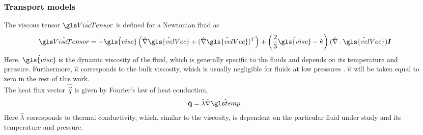 \subsubsection{Transport models}
The viscous tensor $\glsHat{ViscTensor}$ is defined for a Newtonian fluid as
\begin{equation}
\glsHat{ViscTensor}= -\hat{\gls{visc}}\left( \hat\nabla \hat{\gls{velVec}} +(\hat\nabla\hat{\gls{velVec}})^T\right)  + \left(\frac{2}{3}\hat{\gls{visc}} - \hat \kappa \right) (\hat\nabla\cdot \hat{\gls{velVec}})\mytensor{I} 
\end{equation}
Here, $\hat{\gls{visc}}$ is the dynamic viscosity of the fluid, which is generally specific to the fluids and depends on its temperature and pressure. Furthermore, $\hat \kappa$ corresponds to the bulk viscosity, which is usually negligible for fluids at low pressures \citep{birdTransportPhenomena1960}. $\hat \kappa$ will be taken equal to zero in the rest of this work.\\

The heat flux vector $\hat{\vec{q}}$ is given by Fourier's law of heat conduction, 
\begin{equation}
\hat{\vec{q}} = \hat \lambda \hat{\nabla} \glsHat{temp}.
\label{eq:fourierLaw}
\end{equation}
Here $\hat \lambda$ corresponds to thermal conductivity, which, similar to the viscosity, is dependent on the particular fluid under study and its temperature and pressure.

